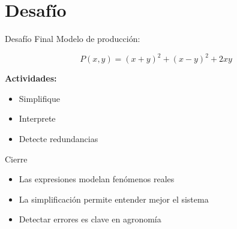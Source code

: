 \documentclass[aspectratio=169,12pt]{beamer}
\begin{document}
	\section{Desafío}
	
	\begin{frame}{Desafío Final}
		Modelo de producción:
		
		\[
		P(x,y) = (x+y)^2 + (x-y)^2 + 2xy
		\]
		
		\pause
		
		\textbf{Actividades:}
		\begin{itemize}
			\item Simplifique
			\item Interprete
			\item Detecte redundancias
		\end{itemize}
		
	\end{frame}
	
	\begin{frame}{Cierre}
		\begin{itemize}
			\item Las expresiones modelan fenómenos reales
			\item La simplificación permite entender mejor el sistema
			\item Detectar errores es clave en agronomía
		\end{itemize}
		
	\end{frame}
	
\end{document}
